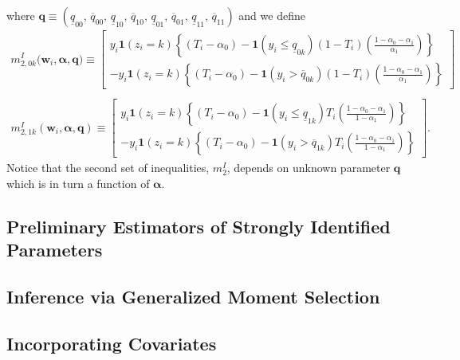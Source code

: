 where $\mathbf{q} \equiv ( \underline{q}_{00},\, \overline{q}_{00},\, \underline{q}_{10}, \,\overline{q}_{10},\, \underline{q}_{01}, \,\overline{q}_{01},\, \underline{q}_{11},\, \overline{q}_{11})$ and we define
\begin{align}
  m_{2,0k}^I\big(\mathbf{w}_i, \boldsymbol{\alpha}, \mathbf{q}) \equiv \left[
  \begin{array}{r}
    y_i \mathbf{1}\left( z_i=k \right)\left\{(T_i - \alpha_0) - \mathbf{1}(y_i \leq \underline{q}_{0k})  (1 - T_i)\left( \frac{1 - \alpha_0 - \alpha_1}{\alpha_1} \right)\right\} \\
    - y_i \mathbf{1}(z_i=k) \left\{ (T_i - \alpha_0) -  \mathbf{1}(y_i > \overline{q}_{0k}) (1 - T_i) \left( \frac{1 - \alpha_0 - \alpha_1}{\alpha_1} \right) \right\} 
\end{array}
\right] \\\nonumber \\
  m_{2,1k}^I(\mathbf{w}_i, \boldsymbol{\alpha}, \mathbf{q}) \equiv \left[
  \begin{array}{r}
    y_i \mathbf{1}\left( z_i=k \right)\left\{(T_i - \alpha_0) - \mathbf{1}(y_i \leq \underline{q}_{1k})  T_i\left( \frac{1 - \alpha_0 - \alpha_1}{1 - \alpha_1} \right)\right\} \\
    - y_i \mathbf{1}(z_i=k) \left\{ (T_i - \alpha_0) -  \mathbf{1}(y_i > \overline{q}_{1k}) T_i \left( \frac{1 - \alpha_0 - \alpha_1}{1 - \alpha_1} \right) \right\} 
\end{array}
\right].
\end{align}
Notice that the second set of inequalities, $m_2^I$, depends on unknown parameter $\mathbf{q}$ which is in turn a function of $\boldsymbol{\alpha}$.



\subsection{Preliminary Estimators of Strongly Identified Parameters}

\subsection{Inference via Generalized Moment Selection}

\subsection{Incorporating Covariates}
\label{sec:covariates}
